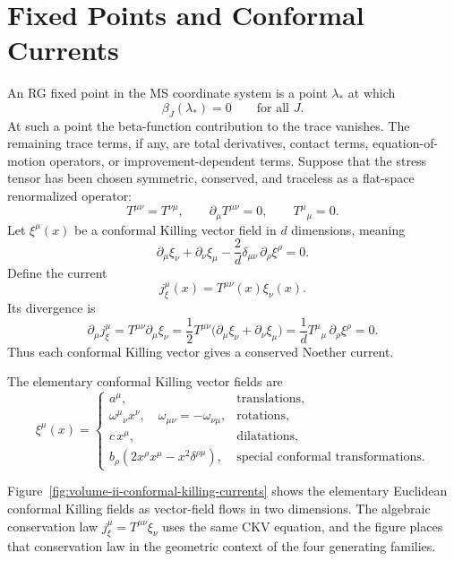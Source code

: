 \section{Fixed Points and Conformal Currents}

An RG fixed point in the MS coordinate system is a point \(\lambda_\ast\) at
which
\[
  \beta_J(\lambda_\ast)=0
  \qquad\text{for all }J .
\]
At such a point the beta-function contribution to the trace vanishes.  The
remaining trace terms, if any, are total derivatives, contact terms,
equation-of-motion operators, or improvement-dependent terms.  Suppose that
the stress tensor has been chosen symmetric, conserved, and traceless as a
flat-space renormalized operator:
\[
  T^{\mu\nu}=T^{\nu\mu},
  \qquad
  \partial_\mu T^{\mu\nu}=0,
  \qquad
  T^\mu{}_\mu=0.
\]
Let \(\xi^\mu(x)\) be a conformal Killing vector field in \(d\) dimensions,
meaning
\[
  \partial_\mu\xi_\nu+\partial_\nu\xi_\mu
  -
  \frac{2}{d}\delta_{\mu\nu}\,\partial_\rho\xi^\rho
  =
  0.
\]
Define the current
\[
  j^\mu_\xi(x)=T^{\mu\nu}(x)\xi_\nu(x).
\]
Its divergence is
\[
  \partial_\mu j^\mu_\xi
  =
  T^{\mu\nu}\partial_\mu\xi_\nu
  =
  \frac12 T^{\mu\nu}
  \bigl(\partial_\mu\xi_\nu+\partial_\nu\xi_\mu\bigr)
  =
  \frac{1}{d}T^\mu{}_\mu\,\partial_\rho\xi^\rho
  =
  0.
\]
Thus each conformal Killing vector gives a conserved Noether current.

The elementary conformal Killing vector fields are
\[
  \xi^\mu(x)
  =
  \begin{cases}
    a^\mu, & \text{translations},\\
    \omega^\mu{}_\nu x^\nu,\quad \omega_{\mu\nu}=-\omega_{\nu\mu},
      & \text{rotations},\\
    c\,x^\mu, & \text{dilatations},\\
    b_\rho(2x^\rho x^\mu-x^2\delta^{\rho\mu}),
      & \text{special conformal transformations}.
  \end{cases}
\]

Figure~\ref{fig:volume-ii-conformal-killing-currents} shows the elementary
Euclidean conformal Killing fields as vector-field flows in two dimensions.
The algebraic conservation law \(j^\mu_\xi=T^{\mu\nu}\xi_\nu\) uses the same
CKV equation, and the figure places that conservation law in the geometric
context of the four generating families.

